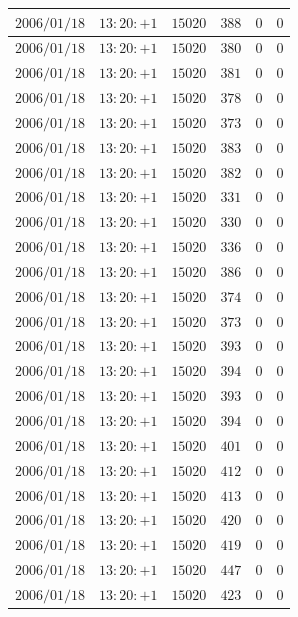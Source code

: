 \documentclass[a4j,papersize,disablejfam,slide,14pt]{jsarticle}
\begin{document}
\begin{description}
\begin{center}
\begin{longtable}{|l|l|l|l|l|l|}
					$2006/01/18$ & $13:20:+1$  & $15020$ & $388$ & $0$ & $0$ \\ \hline
					$2006/01/18$ & $13:20:+1$  & $15020$ & $380$ & $0$ & $0$ \\ \hline
					$2006/01/18$ & $13:20:+1$  & $15020$ & $381$ & $0$ & $0$ \\ \hline
					$2006/01/18$ & $13:20:+1$  & $15020$ & $378$ & $0$ & $0$ \\ \hline
					$2006/01/18$ & $13:20:+1$  & $15020$ & $373$ & $0$ & $0$ \\ \hline
					$2006/01/18$ & $13:20:+1$  & $15020$ & $383$ & $0$ & $0$ \\ \hline
					$2006/01/18$ & $13:20:+1$  & $15020$ & $382$ & $0$ & $0$ \\ \hline
					$2006/01/18$ & $13:20:+1$  & $15020$ & $331$ & $0$ & $0$ \\ \hline
					$2006/01/18$ & $13:20:+1$  & $15020$ & $330$ & $0$ & $0$ \\ \hline
					$2006/01/18$ & $13:20:+1$  & $15020$ & $336$ & $0$ & $0$ \\ \hline
					$2006/01/18$ & $13:20:+1$  & $15020$ & $386$ & $0$ & $0$ \\ \hline
					$2006/01/18$ & $13:20:+1$  & $15020$ & $374$ & $0$ & $0$ \\ \hline
					$2006/01/18$ & $13:20:+1$  & $15020$ & $373$ & $0$ & $0$ \\ \hline
					$2006/01/18$ & $13:20:+1$  & $15020$ & $393$ & $0$ & $0$ \\ \hline
					$2006/01/18$ & $13:20:+1$  & $15020$ & $394$ & $0$ & $0$ \\ \hline
					$2006/01/18$ & $13:20:+1$  & $15020$ & $393$ & $0$ & $0$ \\ \hline
					$2006/01/18$ & $13:20:+1$  & $15020$ & $394$ & $0$ & $0$ \\ \hline
					$2006/01/18$ & $13:20:+1$  & $15020$ & $401$ & $0$ & $0$ \\ \hline
					$2006/01/18$ & $13:20:+1$  & $15020$ & $412$ & $0$ & $0$ \\ \hline
					$2006/01/18$ & $13:20:+1$  & $15020$ & $413$ & $0$ & $0$ \\ \hline
					$2006/01/18$ & $13:20:+1$  & $15020$ & $420$ & $0$ & $0$ \\ \hline
					$2006/01/18$ & $13:20:+1$  & $15020$ & $419$ & $0$ & $0$ \\ \hline
					$2006/01/18$ & $13:20:+1$  & $15020$ & $447$ & $0$ & $0$ \\ \hline
					$2006/01/18$ & $13:20:+1$  & $15020$ & $423$ & $0$ & $0$ \\ \hline

\end{longtable}
\end{center}
\end{description}
\end{document}
